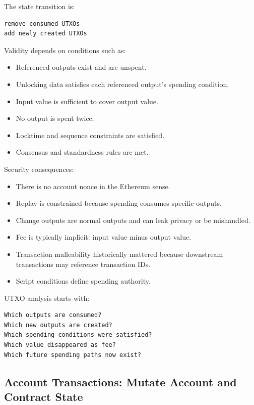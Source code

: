 The state transition is:

\begin{lstlisting}
remove consumed UTXOs
add newly created UTXOs
\end{lstlisting}

Validity depends on conditions such as:

\begin{itemize}
\tightlist
\item
  Referenced outputs exist and are unspent.
\item
  Unlocking data satisfies each referenced output's spending condition.
\item
  Input value is sufficient to cover output value.
\item
  No output is spent twice.
\item
  Locktime and sequence constraints are satisfied.
\item
  Consensus and standardness rules are met.
\end{itemize}

Security consequences:

\begin{itemize}
\tightlist
\item
  There is no account nonce in the Ethereum sense.
\item
  Replay is constrained because spending consumes specific outputs.
\item
  Change outputs are normal outputs and can leak privacy or be
  mishandled.
\item
  Fee is typically implicit: input value minus output value.
\item
  Transaction malleability historically mattered because downstream
  transactions may reference transaction IDs.
\item
  Script conditions define spending authority.
\end{itemize}

UTXO analysis starts with:

\begin{lstlisting}
Which outputs are consumed?
Which new outputs are created?
Which spending conditions were satisfied?
Which value disappeared as fee?
Which future spending paths now exist?
\end{lstlisting}

\subsection{Account Transactions: Mutate Account and Contract State}

